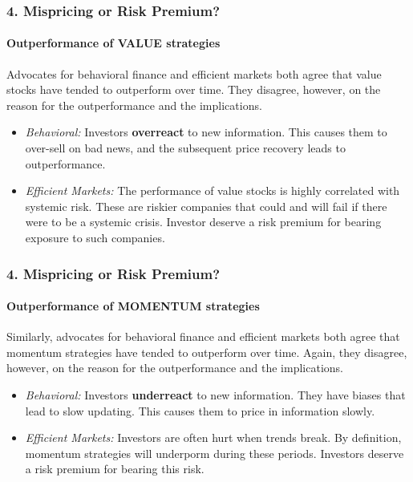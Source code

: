 \documentclass{beamer}
\begin{document}
\begin{frame}[t]
    \frametitle{4. Mispricing or Risk Premium?}
    \framesubtitle{Outperformance of VALUE strategies}

    Advocates for behavioral finance and efficient markets both agree that 
    value stocks have tended to outperform over time.   They disagree, however, 
    on the reason for the outperformance and the implications.\\
    \vspace{1em}
    \begin{itemize}
        \item \textit{Behavioral:} Investors \textbf{overreact} to new information.  
        This causes them to over-sell on bad news, and the subsequent price recovery 
        leads to outperformance.   
        \item \textit{Efficient Markets:} The performance of value stocks is highly 
        correlated with systemic risk.   These are riskier companies that could and will 
        fail if there were to be a systemic crisis.   Investor deserve a risk premium for 
        bearing exposure to such companies.
    \end{itemize} 

\end{frame}

\begin{frame}[t]
    \frametitle{4. Mispricing or Risk Premium?}
    \framesubtitle{Outperformance of MOMENTUM strategies}

    Similarly, advocates for behavioral finance and efficient markets both agree that 
    momentum strategies have tended to outperform over time.   Again, they disagree, however, 
    on the reason for the outperformance and the implications.\\
    \vspace{1em}
    \begin{itemize}
        \item \textit{Behavioral:} Investors \textbf{underreact} to new information.  
        They have biases that lead to slow updating.   This causes them to price in 
        information slowly.   
        \item \textit{Efficient Markets:} Investors are often hurt when trends break. 
        By definition, momentum strategies will underporm during these periods.  
        Investors deserve a risk premium for bearing this risk.
    \end{itemize} 

\end{frame}
\end{document}
